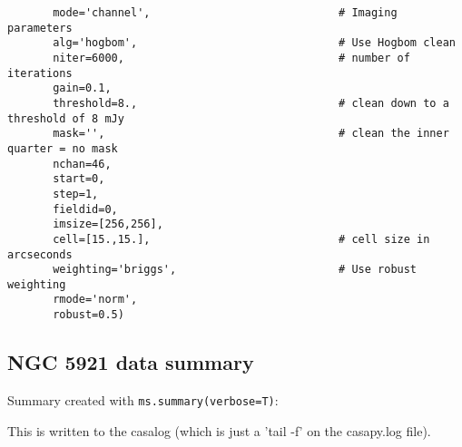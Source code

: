 \begin{verbatim}
       mode='channel',                             # Imaging parameters
       alg='hogbom',                               # Use Hogbom clean
       niter=6000,                                 # number of iterations
       gain=0.1,                      
       threshold=8.,                               # clean down to a threshold of 8 mJy
       mask='',                                    # clean the inner quarter = no mask
       nchan=46,
       start=0,
       step=1,
       fieldid=0,
       imsize=[256,256],             
       cell=[15.,15.],                             # cell size in arcseconds
       weighting='briggs',                         # Use robust weighting
       rmode='norm',
       robust=0.5)
\end{verbatim}
\normalsize

\subsection{NGC 5921 data summary}
\label{subsection:ngc5921.summary}

Summary created with {\tt ms.summary(verbose=T)}:

This is written to the casalog (which is just a 'tail -f' on the
casapy.log file). 

